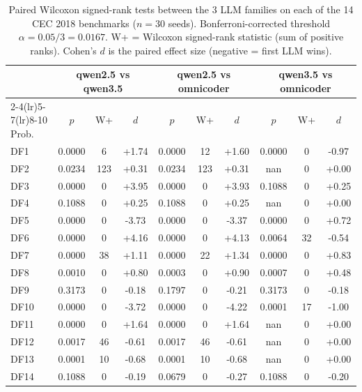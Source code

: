 \begin{table}[t]
\centering
\scriptsize
\caption{Paired Wilcoxon signed-rank tests between the 3 LLM families on each of the 14 CEC 2018 benchmarks ($n=30$ seeds). Bonferroni-corrected threshold $\alpha=0.05/3=0.0167$. W+ = Wilcoxon signed-rank statistic (sum of positive ranks). Cohen's $d$ is the paired effect size (negative = first LLM wins).}
\label{tab:wilcoxon-crossllm}
\begin{tabular}{lccccccccc}
\toprule
 & \multicolumn{3}{c}{qwen2.5 vs qwen3.5} & \multicolumn{3}{c}{qwen2.5 vs omnicoder} & \multicolumn{3}{c}{qwen3.5 vs omnicoder} \\
\cmidrule(lr){2-4}\cmidrule(lr){5-7}\cmidrule(lr){8-10}
Prob. & $p$ & W+ & $d$ & $p$ & W+ & $d$ & $p$ & W+ & $d$ \\
\midrule
DF1   & 0.0000 & 6 & +1.74 & 0.0000 & 12 & +1.60 & 0.0000 & 0 & -0.97 \\
DF2   & 0.0234 & 123 & +0.31 & 0.0234 & 123 & +0.31 & nan & 0 & +0.00 \\
DF3   & 0.0000 & 0 & +3.95 & 0.0000 & 0 & +3.93 & 0.1088 & 0 & +0.25 \\
DF4   & 0.1088 & 0 & +0.25 & 0.1088 & 0 & +0.25 & nan & 0 & +0.00 \\
DF5   & 0.0000 & 0 & -3.73 & 0.0000 & 0 & -3.37 & 0.0000 & 0 & +0.72 \\
DF6   & 0.0000 & 0 & +4.16 & 0.0000 & 0 & +4.13 & 0.0064 & 32 & -0.54 \\
DF7   & 0.0000 & 38 & +1.11 & 0.0000 & 22 & +1.34 & 0.0000 & 0 & +0.83 \\
DF8   & 0.0010 & 0 & +0.80 & 0.0003 & 0 & +0.90 & 0.0007 & 0 & +0.48 \\
DF9   & 0.3173 & 0 & -0.18 & 0.1797 & 0 & -0.21 & 0.3173 & 0 & -0.18 \\
DF10  & 0.0000 & 0 & -3.72 & 0.0000 & 0 & -4.22 & 0.0001 & 17 & -1.00 \\
DF11  & 0.0000 & 0 & +1.64 & 0.0000 & 0 & +1.64 & nan & 0 & +0.00 \\
DF12  & 0.0017 & 46 & -0.61 & 0.0017 & 46 & -0.61 & nan & 0 & +0.00 \\
DF13  & 0.0001 & 10 & -0.68 & 0.0001 & 10 & -0.68 & nan & 0 & +0.00 \\
DF14  & 0.1088 & 0 & -0.19 & 0.0679 & 0 & -0.27 & 0.1088 & 0 & -0.20 \\
\bottomrule
\end{tabular}
\end{table}